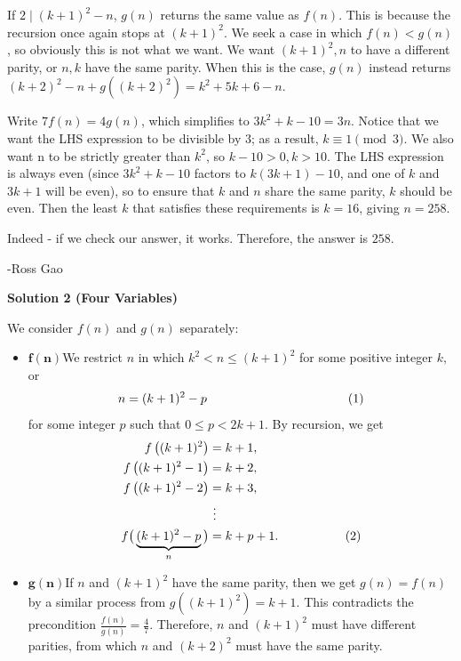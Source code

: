 \begin{enumerate}
 If $2 \mid (k+1)^2-n$, $g(n)$ returns the same value as $f(n)$. This is because the recursion once again stops at $(k+1)^2$. We seek a case in which $f(n)<g(n)$, so obviously this is not what we want. We want $(k+1)^2,n$ to have a different parity, or $n, k$ have the same parity. When this is the case, $g(n)$ instead returns $(k+2)^2-n+g((k+2)^2)=k^2+5k+6-n$.

 Write $7f(n)=4g(n)$, which simplifies to $3k^2+k-10=3n$. Notice that we want the LHS expression to be divisible by 3; as a result, $k \equiv 1 \pmod{3}$. We also want n to be strictly greater than $k^2$, so $k-10>0, k>10$. The LHS expression is always even (since $3k^2+k-10$ factors to $k(3k+1)-10$, and one of $k$ and $3k+1$ will be even), so to ensure that $k$ and $n$ share the same parity, $k$ should be even. Then the least $k$ that satisfies these requirements is $k=16$, giving $n=258$.

 Indeed - if we check our answer, it works. Therefore, the answer is $\boxed{258}$.

 -Ross Gao

 



\textbf{Solution 2 (Four Variables)}

We consider $f(n)$ and $g(n)$ separately:

 
            \begin{itemize} 
        \item $\boldsymbol{f(n)}$We restrict $n$ in which $k^2<n\leq(k+1)^2$ for some positive integer $k,$ or 
 \[n=(k+1)^2-p\hspace{40mm}(1)\] for some integer $p$ such that $0\leq p<2k+1.$ By recursion, we get
 \begin{align*} f\left((k+1)^2\right)&=k+1, \\ f\left((k+1)^2-1\right)&=k+2, \\ f\left((k+1)^2-2\right)&=k+3, \\ & \ \vdots \\ f\bigl(\phantom{ }\underbrace{(k+1)^2-p}_{n}\phantom{ }\bigr)&=k+p+1. \hspace{19mm}(2) \\ \end{align*}



        \item $\boldsymbol{g(n)}$If $n$ and $(k+1)^2$ have the same parity, then we get $g(n)=f(n)$ by a similar process from $g\left((k+1)^2\right)=k+1.$ This contradicts the precondition $\frac{f(n)}{g(n)} = \frac{4}{7}.$ Therefore, $n$ and $(k+1)^2$ must have different parities, from which $n$ and $(k+2)^2$ must have the same parity. 


\end{itemize}
\end{enumerate}
